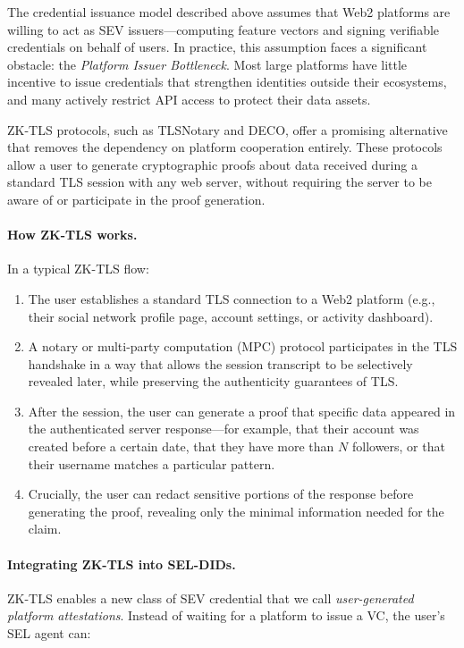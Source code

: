 \documentclass[11pt]{article}
\begin{document}
The credential issuance model described above assumes that Web2 platforms are willing to act as SEV issuers---computing feature vectors and signing verifiable credentials on behalf of users. In practice, this assumption faces a significant obstacle: the \emph{Platform Issuer Bottleneck}. Most large platforms have little incentive to issue credentials that strengthen identities outside their ecosystems, and many actively restrict API access to protect their data assets.

ZK-TLS protocols, such as TLSNotary and DECO, offer a promising alternative that removes the dependency on platform cooperation entirely.\cite{tlsnotary,deco} These protocols allow a user to generate cryptographic proofs about data received during a standard TLS session with any web server, without requiring the server to be aware of or participate in the proof generation.

\paragraph{How ZK-TLS works.} In a typical ZK-TLS flow:

\begin{enumerate}
  \item The user establishes a standard TLS connection to a Web2 platform (e.g., their social network profile page, account settings, or activity dashboard).
  \item A notary or multi-party computation (MPC) protocol participates in the TLS handshake in a way that allows the session transcript to be selectively revealed later, while preserving the authenticity guarantees of TLS.
  \item After the session, the user can generate a proof that specific data appeared in the authenticated server response---for example, that their account was created before a certain date, that they have more than $N$ followers, or that their username matches a particular pattern.
  \item Crucially, the user can redact sensitive portions of the response before generating the proof, revealing only the minimal information needed for the claim.
\end{enumerate}

\paragraph{Integrating ZK-TLS into SEL-DIDs.} ZK-TLS enables a new class of SEV credential that we call \emph{user-generated platform attestations}. Instead of waiting for a platform to issue a VC, the user's SEL agent can:
\end{document}
